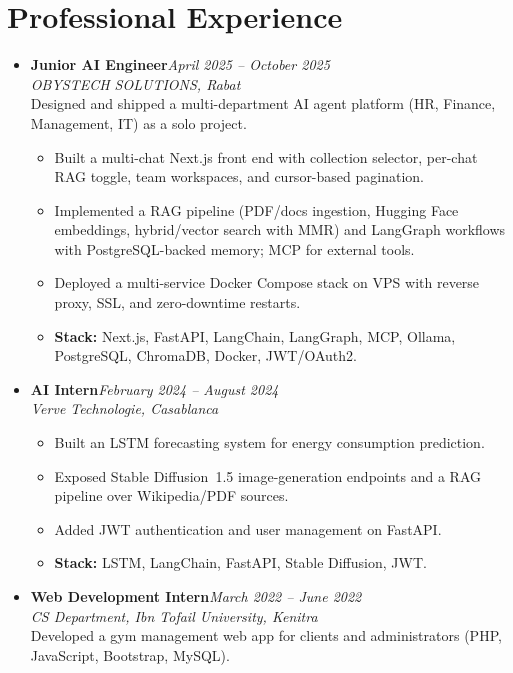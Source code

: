 \documentclass[10pt,a4paper]{article}
\newcommand{\role}[2]{\textbf{#1}\hfill\textit{\color{muted}#2}\\}
\newcommand{\org}[1]{\textit{#1}\\[0.5pt]}
\begin{document}
\section*{Professional Experience}
\begin{itemize}
    \item \role{Junior AI Engineer}{April 2025 -- October 2025}
          \org{OBYSTECH SOLUTIONS, Rabat}
          Designed and shipped a multi-department AI agent platform (HR, Finance, Management, IT) as a solo project.
          \begin{itemize}
              \item Built a multi-chat Next.js front end with collection selector, per-chat RAG toggle, team workspaces, and cursor-based pagination.
              \item Implemented a RAG pipeline (PDF/docs ingestion, Hugging Face embeddings, hybrid/vector search with MMR) and LangGraph workflows with PostgreSQL-backed memory; MCP for external tools.
              \item Deployed a multi-service Docker Compose stack on VPS with reverse proxy, SSL, and zero-downtime restarts.
              \item \textbf{Stack:} Next.js, FastAPI, LangChain, LangGraph, MCP, Ollama, PostgreSQL, ChromaDB, Docker, JWT/OAuth2.
          \end{itemize}

    \item \role{AI Intern}{February 2024 -- August 2024}
          \org{Verve Technologie, Casablanca}
          \begin{itemize}
              \item Built an LSTM forecasting system for energy consumption prediction.
              \item Exposed Stable Diffusion~1.5 image-generation endpoints and a RAG pipeline over Wikipedia/PDF sources.
              \item Added JWT authentication and user management on FastAPI.
              \item \textbf{Stack:} LSTM, LangChain, FastAPI, Stable Diffusion, JWT.
          \end{itemize}

    \item \role{Web Development Intern}{March 2022 -- June 2022}
          \org{CS Department, Ibn Tofail University, Kenitra}
          Developed a gym management web app for clients and administrators (PHP, JavaScript, Bootstrap, MySQL).
\end{itemize}
\end{document}
